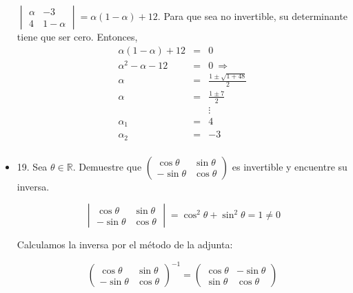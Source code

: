 \documentclass[12pt]{article}
\theoremstyle{plain}
\theoremstyle{definition}
\begin{document}
\begin{itemize}
    $\begin{vmatrix}\alpha&-3\\4&1-\alpha\end{vmatrix}=\alpha(1-\alpha)+12$. Para que sea no invertible, su determinante tiene que ser cero. Entonces, 
    \begin{eqnarray*}
    \alpha(1-\alpha)+12&=&0\\
    \alpha^2-\alpha-12&=&0\ \Rightarrow \\
    \alpha&=&\frac{1\pm\sqrt{1+48}}{2}\\
    \alpha&=&\frac{1\pm7}{2}\\
    && \vdots\\
    \alpha_1&=&4\\
    \alpha_2&=&-3\\
    \end{eqnarray*}
    
    
    \item 19. Sea $\theta\in\mathbb{R}$. Demuestre que $\begin{pmatrix}\cos\theta&\sin\theta\\-\sin\theta& \cos\theta\end{pmatrix}$ es invertible y encuentre su inversa.
    
     $$\begin{vmatrix}\cos\theta&\sin\theta\\-\sin\theta& \cos\theta\end{vmatrix}=\cos^2\theta+\sin^2\theta=1\neq0$$
     
     Calculamos la inversa por el método de la adjunta:
     
     $$\begin{pmatrix}\cos\theta&\sin\theta\\-\sin\theta& \cos\theta\end{pmatrix}^{-1}=\begin{pmatrix}\cos\theta&-\sin\theta\\\sin\theta& \cos\theta\end{pmatrix}$$
    
    
\end{itemize}
\end{document}
